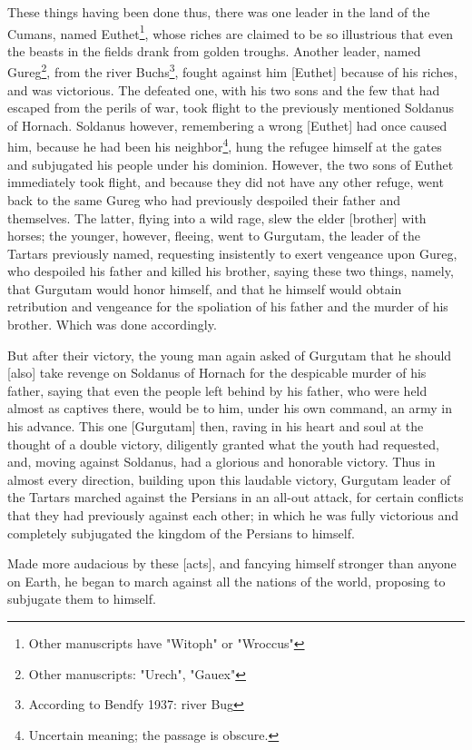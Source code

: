 These things having been done thus, there was one leader in the land of the Cumans, named Euthet\footnote{Other manuscripts have "Witoph" or "Wroccus"}, whose riches are claimed to be so illustrious that even the beasts in the fields drank from golden troughs. Another leader, named Gureg\footnote{Other manuscripts: "Urech", "Gauex"}, from the river Buchs\footnote{According to Bendfy 1937: river Bug}, fought against him [Euthet] because of his riches, and was victorious. The defeated one, with his two sons and the few that had escaped from the perils of war, took flight to the previously mentioned Soldanus of Hornach. Soldanus however, 
remembering a wrong [Euthet] had once caused him, because he had been his neighbor\footnote{Uncertain meaning; the passage is obscure.}, hung the refugee himself at the gates and subjugated his people under his dominion. However, the two sons of Euthet immediately took flight, and because they did not have any other refuge, went back to the same Gureg who had previously despoiled their father and themselves. The latter, flying into a wild rage, slew the elder [brother] with horses; the younger, however, fleeing, went to Gurgutam, the leader of the Tartars previously named, requesting insistently to exert vengeance upon Gureg, who despoiled his father and killed his brother, saying these two things, namely, that Gurgutam would honor himself, and that he himself would obtain retribution and vengeance for the spoliation of his father and the murder of his brother. Which was done accordingly.

But after their victory, the young man again asked of Gurgutam that he should [also] take revenge on Soldanus of Hornach for the despicable murder of his father, saying that even the people left behind by his father, who were held almost as captives there, would be to him, under his own command, an army in his advance. This one [Gurgutam] then, raving in his heart and soul at the thought of a double victory, diligently granted what the youth had requested, and, moving against Soldanus, had a glorious and honorable victory. Thus in almost every direction, building upon this laudable victory, Gurgutam leader of the Tartars marched against the Persians in an all-out attack, for certain conflicts that they had previously against each other; in which he was fully victorious and completely subjugated the kingdom of the Persians to himself.

Made more audacious by these [acts], and fancying himself stronger than anyone on Earth, he began to march against all the nations of the world, proposing to subjugate them to himself. 


